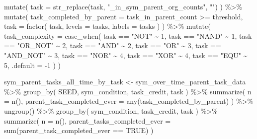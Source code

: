 \documentclass[
]{book}
\newenvironment{Shaded}{\begin{snugshade}}{\end{snugshade}}
\newcommand{\AttributeTok}[1]{\textcolor[rgb]{0.77,0.63,0.00}{#1}}
\newcommand{\ConstantTok}[1]{\textcolor[rgb]{0.00,0.00,0.00}{#1}}
\newcommand{\DecValTok}[1]{\textcolor[rgb]{0.00,0.00,0.81}{#1}}
\newcommand{\FunctionTok}[1]{\textcolor[rgb]{0.00,0.00,0.00}{#1}}
\newcommand{\NormalTok}[1]{#1}
\newcommand{\OtherTok}[1]{\textcolor[rgb]{0.56,0.35,0.01}{#1}}
\newcommand{\SpecialCharTok}[1]{\textcolor[rgb]{0.00,0.00,0.00}{#1}}
\newcommand{\StringTok}[1]{\textcolor[rgb]{0.31,0.60,0.02}{#1}}
\begin{document}
\begin{Shaded}
\begin{Highlighting}[]
  \FunctionTok{mutate}\NormalTok{(}
    \AttributeTok{task =} \FunctionTok{str\_replace}\NormalTok{(task, }\StringTok{"\_in\_sym\_parent\_org\_counts"}\NormalTok{, }\StringTok{""}\NormalTok{)}
\NormalTok{  ) }\SpecialCharTok{\%\textgreater{}\%}
  \FunctionTok{mutate}\NormalTok{(}
    \AttributeTok{task\_completed\_by\_parent =}\NormalTok{ task\_in\_parent\_count }\SpecialCharTok{\textgreater{}=}\NormalTok{ threshold,}
    \AttributeTok{task =} \FunctionTok{factor}\NormalTok{(}
\NormalTok{      task,}
      \AttributeTok{levels =}\NormalTok{ tasks,}
      \AttributeTok{labels =}\NormalTok{ tasks}
\NormalTok{    )}
\NormalTok{  ) }\SpecialCharTok{\%\textgreater{}\%}
  \FunctionTok{mutate}\NormalTok{(}
    \AttributeTok{task\_complexity =} \FunctionTok{case\_when}\NormalTok{(}
\NormalTok{      task }\SpecialCharTok{==} \StringTok{"NOT"} \SpecialCharTok{\textasciitilde{}} \DecValTok{1}\NormalTok{,}
\NormalTok{      task }\SpecialCharTok{==} \StringTok{"NAND"} \SpecialCharTok{\textasciitilde{}} \DecValTok{1}\NormalTok{,}
\NormalTok{      task }\SpecialCharTok{==} \StringTok{"OR\_NOT"} \SpecialCharTok{\textasciitilde{}} \DecValTok{2}\NormalTok{,}
\NormalTok{      task }\SpecialCharTok{==} \StringTok{"AND"} \SpecialCharTok{\textasciitilde{}} \DecValTok{2}\NormalTok{,}
\NormalTok{      task }\SpecialCharTok{==} \StringTok{"OR"} \SpecialCharTok{\textasciitilde{}} \DecValTok{3}\NormalTok{,}
\NormalTok{      task }\SpecialCharTok{==} \StringTok{"AND\_NOT"} \SpecialCharTok{\textasciitilde{}} \DecValTok{3}\NormalTok{,}
\NormalTok{      task }\SpecialCharTok{==} \StringTok{"NOR"} \SpecialCharTok{\textasciitilde{}} \DecValTok{4}\NormalTok{,}
\NormalTok{      task }\SpecialCharTok{==} \StringTok{"XOR"} \SpecialCharTok{\textasciitilde{}} \DecValTok{4}\NormalTok{,}
\NormalTok{      task }\SpecialCharTok{==} \StringTok{"EQU"} \SpecialCharTok{\textasciitilde{}} \DecValTok{5}\NormalTok{,}
      \AttributeTok{.default =} \SpecialCharTok{{-}}\DecValTok{1}
\NormalTok{    )}
\NormalTok{  )}

\NormalTok{sym\_parent\_tasks\_all\_time\_by\_task }\OtherTok{\textless{}{-}}\NormalTok{ sym\_over\_time\_parent\_task\_data }\SpecialCharTok{\%\textgreater{}\%}
  \FunctionTok{group\_by}\NormalTok{(}
\NormalTok{    SEED,}
\NormalTok{    sym\_condition,}
\NormalTok{    task\_credit,}
\NormalTok{    task}
\NormalTok{  ) }\SpecialCharTok{\%\textgreater{}\%}
  \FunctionTok{summarize}\NormalTok{(}
    \AttributeTok{n =} \FunctionTok{n}\NormalTok{(),}
    \AttributeTok{parent\_task\_completed\_ever =} \FunctionTok{any}\NormalTok{(task\_completed\_by\_parent)}
\NormalTok{  ) }\SpecialCharTok{\%\textgreater{}\%}
  \FunctionTok{ungroup}\NormalTok{() }\SpecialCharTok{\%\textgreater{}\%}
  \FunctionTok{group\_by}\NormalTok{(}
\NormalTok{    sym\_condition,}
\NormalTok{    task\_credit,}
\NormalTok{    task}
\NormalTok{  ) }\SpecialCharTok{\%\textgreater{}\%}
  \FunctionTok{summarize}\NormalTok{(}
    \AttributeTok{n =} \FunctionTok{n}\NormalTok{(),}
    \AttributeTok{parent\_tasks\_completed\_ever =} \FunctionTok{sum}\NormalTok{(parent\_task\_completed\_ever }\SpecialCharTok{==} \ConstantTok{TRUE}\NormalTok{)}
\NormalTok{  )}
\end{Highlighting}
\end{Shaded}
\end{document}
